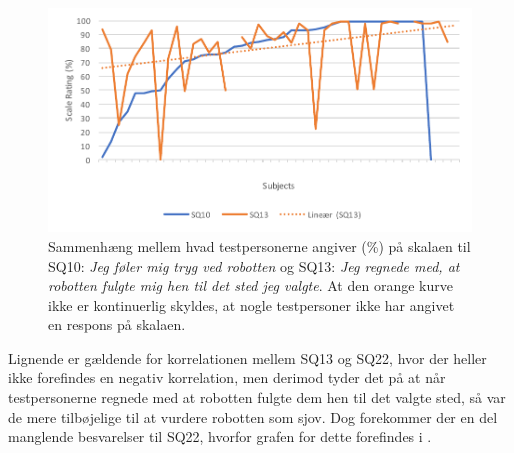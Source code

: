 %
\begin{figure}[H]
	\centering
	\includegraphics[width=\textwidth]{Figure/Korrelationsgrafer/SQ10+SQ13}
	\caption{Sammenhæng mellem hvad testpersonerne angiver (\%) på skalaen til SQ10: \textit{Jeg føler mig tryg ved robotten} og SQ13: \textit{Jeg regnede med, at robotten fulgte mig hen til det sted jeg valgte}. At den orange kurve ikke er kontinuerlig skyldes, at nogle testpersoner ikke har angivet en respons på skalaen.}
	\label{fig:SammenligningSQ10SQ13}
\end{figure}
\noindent
%
Lignende er gældende for korrelationen mellem SQ13 og SQ22, hvor der heller ikke forefindes en negativ korrelation, men derimod tyder det på at når testpersonerne regnede med at robotten fulgte dem hen til det valgte sted, så var de mere tilbøjelige til at vurdere robotten som sjov. Dog forekommer der en del manglende besvarelser til SQ22, hvorfor grafen for dette forefindes i . 

